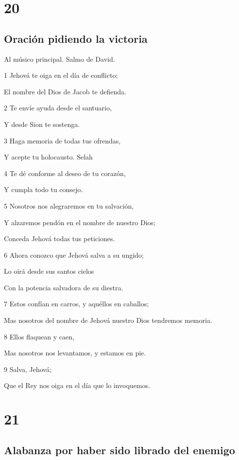 \chapter{20}

\section*{Oración pidiendo la victoria}

\par Al músico principal. Salmo de David.

\par 1 Jehová te oiga en el día de conflicto;
\par El nombre del Dios de Jacob te defienda.
\par 2 Te envíe ayuda desde el santuario,
\par Y desde Sion te sostenga.
\par 3 Haga memoria de todas tus ofrendas,
\par Y acepte tu holocausto. Selah
\par 4 Te dé conforme al deseo de tu corazón,
\par Y cumpla todo tu consejo.
\par 5 Nosotros nos alegraremos en tu salvación,
\par Y alzaremos pendón en el nombre de nuestro Dios;
\par Conceda Jehová todas tus peticiones.
\par 6 Ahora conozco que Jehová salva a su ungido;
\par Lo oirá desde sus santos cielos
\par Con la potencia salvadora de su diestra.
\par 7 Estos confían en carros, y aquéllos en caballos;
\par Mas nosotros del nombre de Jehová nuestro Dios tendremos memoria.
\par 8 Ellos flaquean y caen,
\par Mas nosotros nos levantamos, y estamos en pie.
\par 9 Salva, Jehová;
\par Que el Rey nos oiga en el día que lo invoquemos.

\chapter{21}

\section*{Alabanza por haber sido librado del enemigo}

